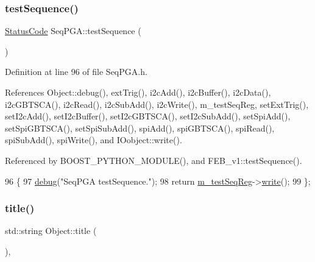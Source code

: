 \subsubsection{\texorpdfstring{test\+Sequence()}{testSequence()}}
{\footnotesize\ttfamily \hyperlink{classStatusCode}{Status\+Code} Seq\+P\+G\+A\+::test\+Sequence (\begin{DoxyParamCaption}{ }\end{DoxyParamCaption})\hspace{0.3cm}{\ttfamily [inline]}}



Definition at line 96 of file Seq\+P\+G\+A.\+h.



References Object\+::debug(), ext\+Trig(), i2c\+Add(), i2c\+Buffer(), i2c\+Data(), i2c\+G\+B\+T\+S\+C\+A(), i2c\+Read(), i2c\+Sub\+Add(), i2c\+Write(), m\+\_\+test\+Seq\+Reg, set\+Ext\+Trig(), set\+I2c\+Add(), set\+I2c\+Buffer(), set\+I2c\+G\+B\+T\+S\+C\+A(), set\+I2c\+Sub\+Add(), set\+Spi\+Add(), set\+Spi\+G\+B\+T\+S\+C\+A(), set\+Spi\+Sub\+Add(), spi\+Add(), spi\+G\+B\+T\+S\+C\+A(), spi\+Read(), spi\+Sub\+Add(), spi\+Write(), and I\+Oobject\+::write().



Referenced by B\+O\+O\+S\+T\+\_\+\+P\+Y\+T\+H\+O\+N\+\_\+\+M\+O\+D\+U\+L\+E(), and F\+E\+B\+\_\+v1\+::test\+Sequence().


\begin{DoxyCode}
96                             \{
97     \hyperlink{classObject_aac010553f022165573714b7014a15f0d}{debug}(\textcolor{stringliteral}{"SeqPGA testSequence."});
98     \textcolor{keywordflow}{return} \hyperlink{classSeqPGA_a7478537516c951a4d08f23b0789ed6d9}{m\_testSeqReg}->\hyperlink{classIOobject_a9f6984bc9f0fadcf800f1be2523ac744}{write}();
99   \};
\end{DoxyCode}
\mbox{\label{classObject_a73a0f1a41828fdd8303dd662446fb6c3}} 
\subsubsection{\texorpdfstring{title()}{title()}}
{\footnotesize\ttfamily std\+::string Object\+::title (\begin{DoxyParamCaption}{ }\end{DoxyParamCaption})\hspace{0.3cm}{\ttfamily [inline]}, {\ttfamily [inherited]}}




